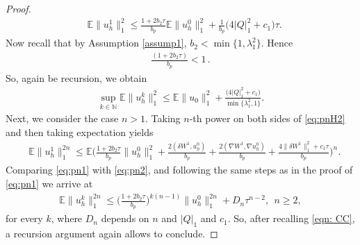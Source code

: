 \documentclass[reqno, 11pt]{amsart}
\theoremstyle{plain}
\theoremstyle{definition}
\theoremstyle{remark}
\numberwithin{equation}{section}
\numberwithin{theorem}{section}
\newcommand{\N}{\mathbb{N}}
\begin{document}
{\begin{proof}
\begin{align}
&\mathbb{E}\|u_h^1\|_1^2
\leq \frac{1+2b_2\tau}{b_p}\mathbb{E}\|u_h^0\|_1^2+\frac{1}{b_p}\big(4|Q|_1^2+c_1\big)\tau.
\end{align}
Now recall  that by Assumption \ref{assump1}, $b_2< \min\{1, \lambda_1^2\}$. Hence
\begin{align}\label{eqn: CC}
\frac{(1+2b_2 \tau)}{b_p}<1 \,. 
\end{align}
So, again be recursion, we obtain
\begin{align}
\sup\limits_{k\in \N}\mathbb{E} \| u_h^k\|_1^2\leq \mathbb E\|u_0\|_1^2+\frac{\big(4|Q|_1^2+c_1\big)}{\min\{\lambda_1^2, 1\}}. 
\end{align}
Next, we consider the case $n>1$.  
Taking $n$-th power on both sides of \eqref{eq:pnH2} and then  taking expectation yields
\begin{align}\label{eq:pn2}
&\mathbb{E}\| u_h^1\|_1^{2n}
\leq \mathbb E\bigg(\frac{1+2b_2\tau}{b_p}\|u_h^0\|_1^2+\frac{2(\delta W^1, u_h^0)}{b_p}+\frac{2(\nabla W^1,\nabla u_h^0)}{b_p}+\frac{4\|\delta W^1\|_1^2+c_1\tau}{b_p}\bigg)^n.
\end{align}
Comparing \eqref{eq:pn1} with \eqref{eq:pn2}, and  following the same steps as in the proof of \eqref{eq:pn1} we arrive at
\begin{align}
\mathbb{E}\| u_h^k\|_1^{2n}\leq \bigg(\frac{1+2b_2\tau}{b_p}\bigg)^{k(n-1)}\|u_h^0\|_1^{2n}+D_n \tau^{n-2}, \ \ n\geq 2,
\end{align}
for every $k$, where $D_n$ depends on $n$ and $|Q|_1$ and $c_1$. So, after recalling \eqref{eqn: CC},  a recursion argument again allows to conclude. 
\end{proof}







}
\end{document}
